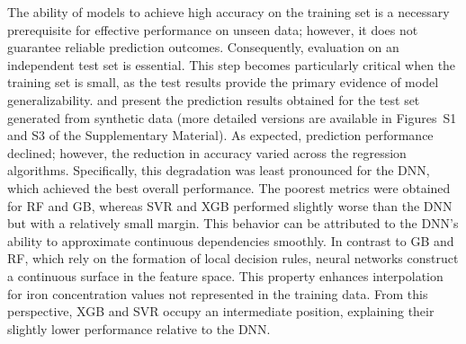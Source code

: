 \documentclass[10pt]{iopart}
\begin{document}
The ability of models to achieve high accuracy on the training set is a necessary prerequisite for effective performance on unseen data; 
however, it does not guarantee reliable prediction outcomes. 
Consequently, evaluation on an independent test set is essential. 
This step becomes particularly critical when the training set is small, as the test results provide the primary evidence of model generalizability.
 and  present the prediction results obtained for the test set generated from synthetic data 
(more detailed versions are available in Figures~S1 and S3 of the Supplementary Material). 
As expected, prediction performance declined; however, the reduction in accuracy varied across the regression algorithms. 
Specifically, this degradation was least pronounced for the DNN, which achieved the best overall performance. 
The poorest metrics were obtained for RF and GB, whereas SVR and XGB performed slightly worse than the DNN but with a relatively small margin.
This behavior can be attributed to the DNN’s ability to approximate continuous dependencies smoothly. 
In contrast to GB and RF, which rely on the formation of local decision rules, 
neural networks construct a continuous surface in the feature space. 
This property enhances interpolation for iron concentration values not represented in the training data. 
From this perspective, XGB and SVR occupy an intermediate position, explaining their slightly lower performance relative to the DNN.
\end{document}
